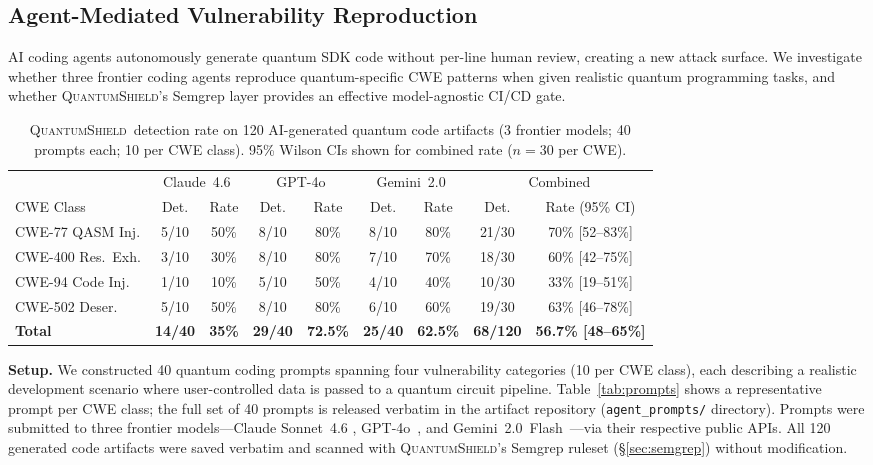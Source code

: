 \documentclass[conference,compsoc]{IEEEtran}
\newcommand{\tool}{\textsc{QuantumShield}}
\begin{document}
\subsection{Agent-Mediated Vulnerability Reproduction}
\label{sec:agent}
\noindent AI coding agents autonomously generate quantum SDK code without
per-line human review, creating a new attack surface.
We investigate whether three frontier coding agents reproduce
quantum-specific CWE patterns when given realistic quantum programming
tasks, and whether \tool's Semgrep layer provides an effective
model-agnostic CI/CD gate.

\begin{table}[!t]
\centering
\caption{%
  \tool\ detection rate on 120 AI-generated quantum code artifacts
  (3 frontier models; 40 prompts each; 10 per CWE class).
  95\% Wilson CIs shown for combined rate ($n{=}30$ per CWE).}
\label{tab:agent}
\setlength{\tabcolsep}{4pt}
\begin{tabular}{lcccccccc}
\toprule
 & \multicolumn{2}{c}{Claude~4.6} &
   \multicolumn{2}{c}{GPT-4o} &
   \multicolumn{2}{c}{Gemini~2.0} &
   \multicolumn{2}{c}{Combined} \\
\cmidrule(lr){2-3}\cmidrule(lr){4-5}\cmidrule(lr){6-7}\cmidrule(lr){8-9}
CWE Class & Det. & Rate & Det. & Rate & Det. & Rate & Det. & Rate (95\% CI) \\
\midrule
CWE-77 QASM Inj.   & 5/10 & 50\% & 8/10 & 80\% & 8/10 & 80\% & 21/30 & 70\% [52--83\%] \\
CWE-400 Res.\ Exh. & 3/10 & 30\% & 8/10 & 80\% & 7/10 & 70\% & 18/30 & 60\% [42--75\%] \\
CWE-94 Code Inj.   & 1/10 & 10\% & 5/10 & 50\% & 4/10 & 40\% & 10/30 & 33\% [19--51\%] \\
CWE-502 Deser.     & 5/10 & 50\% & 8/10 & 80\% & 6/10 & 60\% & 19/30 & 63\% [46--78\%] \\
\midrule
\textbf{Total} & \textbf{14/40} & \textbf{35\%} &
                 \textbf{29/40} & \textbf{72.5\%} &
                 \textbf{25/40} & \textbf{62.5\%} &
                 \textbf{68/120} & \textbf{56.7\% [48--65\%]} \\
\bottomrule
\end{tabular}
\end{table}

\noindent \textbf{Setup.}
We constructed 40 quantum coding prompts spanning four vulnerability
categories (10 per CWE class), each describing a realistic development
scenario where user-controlled data is passed to a quantum circuit
pipeline.
Table~\ref{tab:prompts} shows a representative prompt per CWE class;
the full set of 40 prompts is released verbatim in the artifact
repository (\texttt{agent\_prompts/} directory).
Prompts were submitted to three frontier models---Claude Sonnet~4.6
\cite{anthropic2026claude}, GPT-4o~\cite{openai2024gpt4o}, and
Gemini~2.0~Flash~\cite{google2024gemini}---via their respective public
APIs.
All 120 generated code artifacts were saved verbatim and scanned with
\tool's Semgrep ruleset (\S\ref{sec:semgrep}) without modification.
\end{document}
